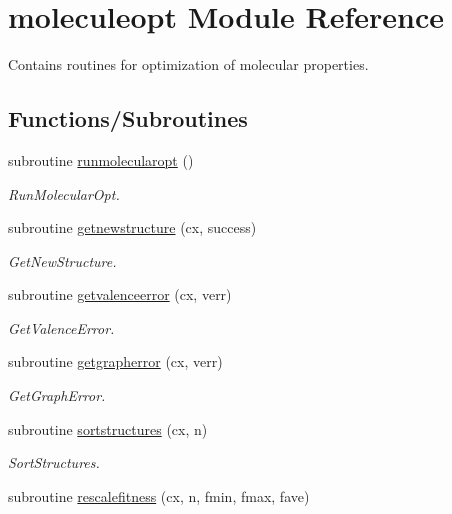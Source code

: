 \hypertarget{namespacemoleculeopt}{}\section{moleculeopt Module Reference}
\label{namespacemoleculeopt}


Contains routines for optimization of molecular properties.  


\subsection*{Functions/\+Subroutines}
\begin{DoxyCompactItemize}
\item 
subroutine \mbox{\hyperlink{namespacemoleculeopt_a456ab3eee90f480fc542c9869a06acc6}{runmolecularopt}} ()
\begin{DoxyCompactList}\small\item\em Run\+Molecular\+Opt. \end{DoxyCompactList}\item 
subroutine \mbox{\hyperlink{namespacemoleculeopt_ab418bbd775aed900cd65977242b325b3}{getnewstructure}} (cx, success)
\begin{DoxyCompactList}\small\item\em Get\+New\+Structure. \end{DoxyCompactList}\item 
subroutine \mbox{\hyperlink{namespacemoleculeopt_a294fbc3509e3679a23a37b4a2fc827b4}{getvalenceerror}} (cx, verr)
\begin{DoxyCompactList}\small\item\em Get\+Valence\+Error. \end{DoxyCompactList}\item 
subroutine \mbox{\hyperlink{namespacemoleculeopt_a5b7e096d3dacf408967cfa4ab8326d11}{getgrapherror}} (cx, verr)
\begin{DoxyCompactList}\small\item\em Get\+Graph\+Error. \end{DoxyCompactList}\item 
subroutine \mbox{\hyperlink{namespacemoleculeopt_a8cddb40ff4bcb60b423971d0f7547a0a}{sortstructures}} (cx, n)
\begin{DoxyCompactList}\small\item\em Sort\+Structures. \end{DoxyCompactList}\item 
subroutine \mbox{\hyperlink{namespacemoleculeopt_a8212379663e0215a8c9300ce1674e51f}{rescalefitness}} (cx, n, fmin, fmax, fave)

\end{DoxyCompactItemize}
